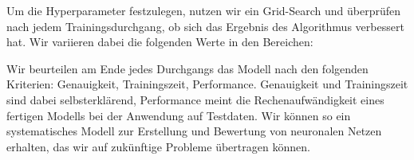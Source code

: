Um die Hyperparameter festzulegen, nutzen wir ein Grid-Search und überprüfen nach jedem Trainingsdurchgang, ob sich das Ergebnis des Algorithmus verbessert hat. Wir variieren dabei die folgenden Werte in den Bereichen:

Wir beurteilen am Ende jedes Durchgangs das Modell nach den folgenden Kriterien: Genauigkeit, Trainingszeit, Performance. Genauigkeit und Trainingszeit sind dabei selbsterklärend, Performance meint die Rechenaufwändigkeit eines fertigen Modells bei der Anwendung auf Testdaten. Wir können so ein systematisches Modell zur Erstellung und Bewertung von neuronalen Netzen erhalten, das wir auf zukünftige Probleme übertragen können.
